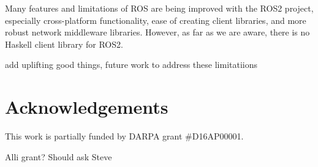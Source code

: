 \documentclass[sigconf]{acmart}
\begin{document}
Many features and limitations of ROS are being improved with the ROS2 project,
especially cross-platform functionality, ease of creating client libraries, and
more robust network middleware libraries. However, as far as we are aware, there
is no Haskell client library for ROS2.

{\color{red}add uplifting good things, future work to address these limitatiions}

\section{Acknowledgements}

This work is partially funded by DARPA grant \#D16AP00001.

{\color{red} Alli grant? Should ask Steve}



\end{document}
